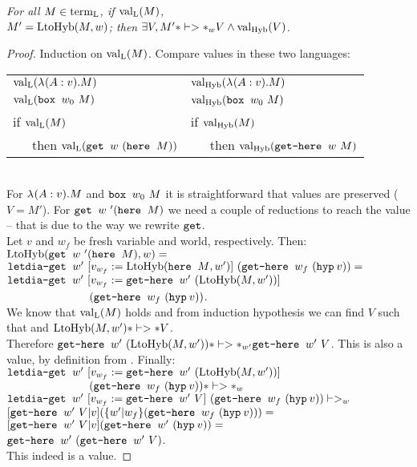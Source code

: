 \begin{theorem}\em
For all $M \in \teL{}$, if $\val[\tL]{M}$,\\
${M' = \funLtoHyb{M}{w}}$; then $\exists V, M' *|->*_w V \wedge \val[\tHyb]V$.
\begin{proof}
Induction on $\val[\tL]{M}$. Compare values in these two languages:\\

\begin{tabular}{ l l }
$\val[\tL]{\lam A v M}$&
$\val[\tHyb]{\lam A v M}$ \\
$\val[\tL]{\bbox {w_0} M}$&
$\val[\tHyb]{\bbox {w_0} M}$ \\
if ${\val [\tL] M}$ &
if ${\val [\tHyb] M}$ \\
~~~then ${\val [\tL] {\get w (\here M)}}$&
~~~then ${\val [\tHyb] {\gethere w M}}$
\end{tabular}\\

For $\lam{A}{v}{M}$ and $\bbox{w_0}{M}$ it is straightforward that values are preserved ($V = M'$). For $\get w' (\here M)$ we need a couple of reductions to reach the value -- that is due to the way we rewrite $\gete{}$.\\ 

Let $v$ and $w_f$ be fresh variable and world, respectively. Then:\\[0.1cm]
$\funLtoHyb{\get w' (\here M)}{w} = $\\[0.1cm]
$\letdiaget{w'}{v}{w_f}{\funLtoHyb{\here M}{w'}}{(\gethere {w_f}{(\hyp{v})})} = $\\[0.1cm]
$\letdiaget{w'}{v}{w_f}{\gethere {w'} {(\funLtoHyb{M}{w'})}}{}$\\[0.1cm]
$~~~~~~~~~~~~~~~~~~~~~~{(\gethere {w_f}{(\hyp{v})})}$. \\

We know that $\val[\tL]{M}$ holds and from induction hypothesis we can find $V$ such that  and $\funLtoHyb{M}{w'} *|->* V$.\\
Therefore $\gethere {w'} {(\funLtoHyb{M}{w'})} *|->*_{w'} \gethere{w'}{V}$. This is also a value, by definition from \langHyb{}. Finally:\\[0.1cm]
$\letdiaget{w'}{v}{w_f}{\gethere{w'}{(\funLtoHyb{M}{w'})}}{}$\\[0.1cm]
$~~~~~~~~~~~~~~~~~~~~~~{(\gethere{w_f}{(\hyp{v}))}} *|->*_w $\\[0.1cm]
$\letdiaget{w'}{v}{w_f}{\gethere{w'} V}{(\gethere {w_f}{(\hyp{v})})} |->_w $\\[0.1cm]
$\substt{\gethere{w'}{V}}{v}{(\substw{w'}{w_f}{(\gethere {w_f}{(\hyp{v})})})} =$\\[0.1cm]
$\substt{\gethere{w'}{V}}{v}{(\gethere{w'}{(\hyp{v})})} = $\\[0.1cm]
$\gethere{w'}{(\gethere{w'}{V})} $.\\[0.1cm]
This indeed is a value.
\end{proof}
\end{theorem}

